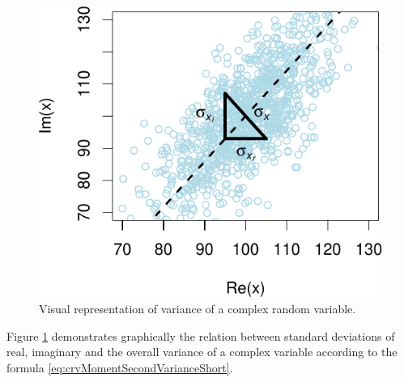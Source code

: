 \documentclass[
]{book}
\begin{document}
\begin{figure}
\centering
\includegraphics{Svetunkov---Svetunkov---Complex-Valued-Econometrics_files/figure-latex/crvMomentSecondVariance-1.pdf}
\caption{\label{fig:crvMomentSecondVariance}Visual representation of variance of a complex random variable.}
\end{figure}

Figure \ref{fig:crvMomentSecondVariance} demonstrates graphically the relation between standard deviations of real, imaginary and the overall variance of a complex variable according to the formula \eqref{eq:crvMomentSecondVarianceShort}.
\end{document}
